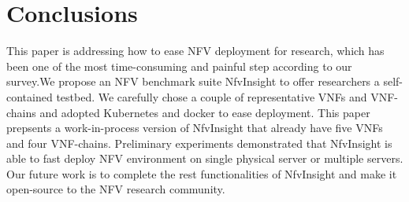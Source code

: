 \section{Conclusions}

This paper is addressing how to ease NFV deployment for research,
which has been one of the most time-consuming and painful step according 
to our survey.We propose an NFV benchmark suite NfvInsight to offer
researchers a self-contained testbed. We carefully chose 
a couple of representative VNFs and VNF-chains and adopted 
Kubernetes and docker to ease deployment. This paper prepsents
a work-in-process version of NfvInsight that already have five VNFs
and four VNF-chains. Preliminary experiments demonstrated
that NfvInsight is able to fast deploy NFV environment on single physical
server or multiple servers. Our future work is to complete the 
rest functionalities of NfvInsight and make it open-source to the
NFV research community. 